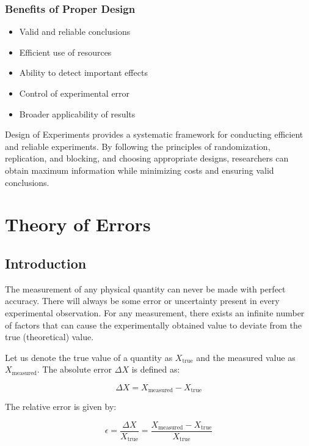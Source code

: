 \documentclass[twoside]{book}
\begin{document}
\subsection{Benefits of Proper Design}

\begin{itemize}
    \item Valid and reliable conclusions
    \item Efficient use of resources
    \item Ability to detect important effects
    \item Control of experimental error
    \item Broader applicability of results
\end{itemize}

Design of Experiments provides a systematic framework for conducting efficient and reliable experiments. By following the principles of randomization, replication, and blocking, and choosing appropriate designs, researchers can obtain maximum information while minimizing costs and ensuring valid conclusions.

\chapter{Theory of Errors}

\section{Introduction}

The measurement of any physical quantity can never be made with perfect accuracy. There will always be some error or uncertainty present in every experimental observation. For any measurement, there exists an infinite number of factors that can cause the experimentally obtained value to deviate from the true (theoretical) value.

Let us denote the true value of a quantity as $X_{\text{true}}$ and the measured value as $X_{\text{measured}}$. The absolute error $\Delta X$ is defined as:

\begin{equation*}
\Delta X = X_{\text{measured}} - X_{\text{true}}
\end{equation*}

The relative error is given by:

\begin{equation*}
\epsilon = \frac{\Delta X}{X_{\text{true}}} = \frac{X_{\text{measured}} - X_{\text{true}}}{X_{\text{true}}}
\end{equation*}
\end{document}
